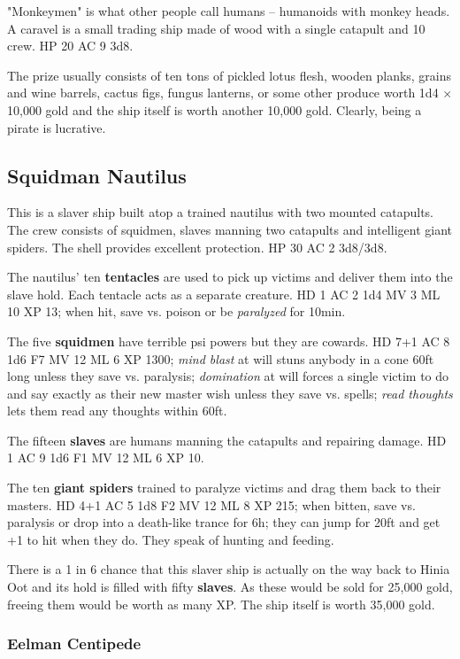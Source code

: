 \documentclass[11pt]{bxart}
\begin{document}
"Monkeymen" is what other people call humans – humanoids with monkey heads. A caravel is a small trading ship made of wood with a single catapult and 10 crew. HP 20 AC 9 3d8.

The prize usually consists of ten tons of pickled lotus flesh, wooden planks, grains and wine barrels, cactus figs, fungus lanterns, or some other produce worth 1d4 × 10,000 gold and the ship itself is worth another 10,000 gold. Clearly, being a pirate is lucrative.

\subsection{Squidman Nautilus}

This is a slaver ship built atop a trained nautilus with two mounted catapults. The crew consists of squidmen, slaves manning two catapults and intelligent giant spiders. The shell provides excellent protection. HP 30 AC 2 3d8/3d8.

The nautilus' ten \textbf{tentacles} are used to pick up victims and deliver them into the slave hold. Each tentacle acts as a separate creature. HD 1 AC 2 1d4 MV 3 ML 10 XP 13; when hit, save vs. poison or be \textit{paralyzed} for 10min.

The five \textbf{squidmen} have terrible psi powers but they are cowards. HD 7+1 AC 8 1d6 F7 MV 12 ML 6 XP 1300; \textit{mind blast} at will stuns anybody in a cone 60ft long unless they save vs. paralysis; \textit{domination} at will forces a single victim to do and say exactly as their new master wish unless they save vs. spells; \textit{read thoughts} lets them read any thoughts within 60ft.

The fifteen \textbf{slaves} are humans manning the catapults and repairing damage. HD 1 AC 9 1d6 F1 MV 12 ML 6 XP 10.

The ten \textbf{giant spiders} trained to paralyze victims and drag them back to their masters. HD 4+1 AC 5 1d8 F2 MV 12 ML 8 XP 215; when bitten, save vs. paralysis or drop into a death-like trance for 6h; they can jump for 20ft and get +1 to hit when they do. They speak of hunting and feeding.

There is a 1 in 6 chance that this slaver ship is actually on the way back to Hinia Oot and its hold is filled with fifty \textbf{slaves}. As these would be sold for 25,000 gold, freeing them would be worth as many XP. The ship itself is worth 35,000 gold.

\subsubsection{Eelman Centipede}
\end{document}
